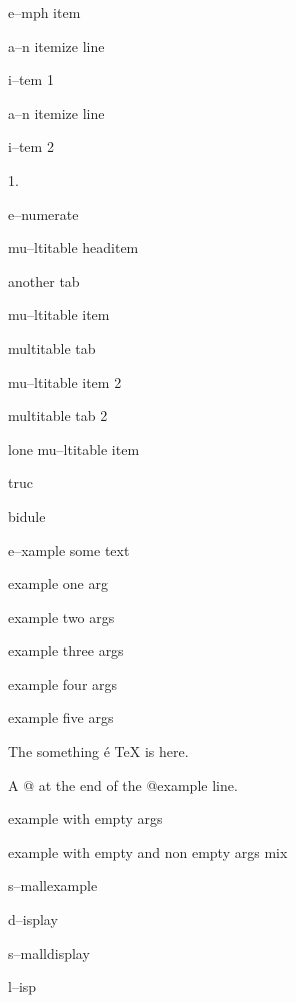 \documentclass{book}
\begin{document}
e--mph item






\textbullet{} a--n itemize line 

i--tem 1


\textbullet{} a--n itemize line 

i--tem 2




1. 

e--numerate




mu--ltitable headitem 

another tab


mu--ltitable item 

multitable tab


mu--ltitable item 2 

multitable tab 2


lone mu--ltitable item




truc 

bidule




e--xample  some
   text




example one arg




example two args




example three args




example four args




example five args




The something \'{e} \TeX{} is here.




A @ at the end of the @example line.




example with empty args




example with empty and non empty args mix




s--mallexample




d--isplay




s--malldisplay




l--isp
\end{document}
